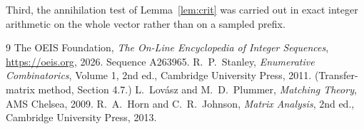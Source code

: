 \documentclass[11pt,a4paper]{article}
\theoremstyle{plain}
\theoremstyle{definition}
\begin{document}
Third, the annihilation test of Lemma~\ref{lem:crit} was carried out in exact integer
arithmetic on the whole vector rather than on a sampled prefix.

\begin{thebibliography}{9}
 The OEIS Foundation, \emph{The On-Line Encyclopedia of Integer
Sequences}, \url{https://oeis.org}, 2026. Sequence A263965.
 R.~P.~Stanley, \emph{Enumerative Combinatorics}, Volume 1, 2nd ed.,
Cambridge University Press, 2011. (Transfer-matrix method, Section 4.7.)
 L.~Lov\'asz and M.~D.~Plummer, \emph{Matching Theory}, AMS Chelsea, 2009.
 R.~A.~Horn and C.~R.~Johnson, \emph{Matrix Analysis}, 2nd ed., Cambridge
University Press, 2013.
\end{thebibliography}
\end{document}
